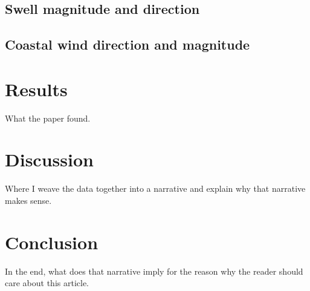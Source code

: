 \documentclass[12pt, letterpaper]{article}
\begin{document}
	\subsection{Swell magnitude and direction}

	\subsection {Coastal wind direction and magnitude}

	\section{Results}
	What the paper found. \cite{swells-deep-water-waves}

	\section {Discussion}
	Where I weave the data together into a narrative and explain why that narrative makes sense.

	\section {Conclusion}
	In the end, what does that narrative imply for the reason why the reader should care about this article.

	
	
\end{document}
